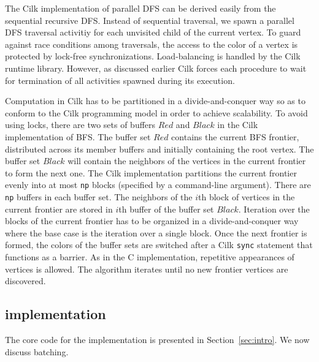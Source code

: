 The Cilk implementation of parallel DFS can be derived easily from the
sequential recursive DFS. Instead of sequential traversal, we spawn a
parallel DFS traversal activitiy for each unvisited child of the
current vertex. To guard against race conditions among traversals, the
access to the color of a vertex is protected by lock-free
synchronizations. Load-balancing is handled by the Cilk runtime
library. However, as discussed earlier Cilk forces each procedure to
wait for termination of all activities spawned during its execution.

Computation in Cilk has to be partitioned in a divide-and-conquer way
so as to conform to the Cilk programming model in order to achieve
scalability. To avoid using locks, there are two sets of buffers $Red$
and $Black$ in the Cilk implementation of BFS.  The buffer set $Red$
contains the current BFS frontier, distributed across its member
buffers and initially containing the root vertex. The buffer set
$Black$ will contain the neighbors of the vertices in the current
frontier to form the next one. The Cilk implementation partitions the
current frontier evenly into at most {\tt np} blocks (specified by a
command-line argument). There 
are {\tt np} buffers in each buffer set. The neighbors of
the $i$th block of vertices in the current frontier are stored in
$i$th buffer of the buffer set $Black$. Iteration over the blocks of
the current frontier has to be organized in a divide-and-conquer way
where the base case is the iteration over a single block. Once the
next frontier is formed, the colors of the buffer sets are switched
after a Cilk {\tt sync} statement that functions as a barrier.  As in
the C implementation, repetitive appearances of vertices is
allowed. The algorithm iterates until no new frontier vertices are
discovered.


\subsection{\XWS{} implementation}\label{sec:Performance}

The core code for the \XWS{} implementation is presented in 
Section~\ref{sec:intro}.  We now discuss batching.


